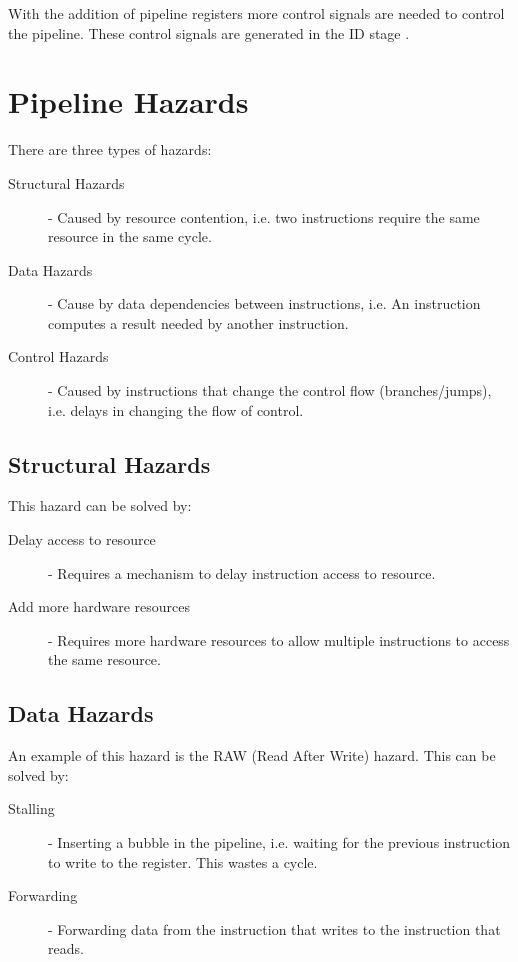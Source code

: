 \documentclass[12pt letter]{report}
\begin{document}
With the addition of pipeline registers more control signals are needed to control the pipeline. These control signals are generated in the ID stage .

\section{Pipeline Hazards}


There are three types of hazards:
\begin{description}
  \item[Structural Hazards] - Caused by resource contention, i.e. two instructions require the same resource in the same cycle.
  \item[Data Hazards] - Cause by data dependencies between instructions, i.e. An instruction computes a result needed by another instruction.
  \item[Control Hazards] - Caused by instructions that change the control flow (branches/jumps), i.e. delays in changing the flow of control.
\end{description}

\subsection{Structural Hazards}
This hazard can be solved by:
\begin{description}
  \item[Delay access to resource] - Requires a mechanism to delay instruction access to resource.
  \item[Add more hardware resources] - Requires more hardware resources to allow multiple instructions to access the same resource.
\end{description}

\subsection{Data Hazards}
An example of this hazard is the RAW (Read After Write) hazard. This can be solved by:
\begin{description}
  \item[Stalling]  - Inserting a bubble in the pipeline, i.e. waiting for the previous instruction to write to the register. This wastes a cycle.
  \item[Forwarding] - Forwarding data from the instruction that writes to the instruction that reads.
\end{description}
\end{document}
